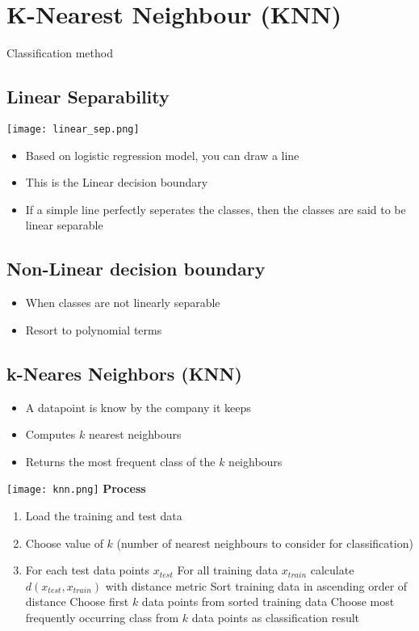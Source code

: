 \section{K-Nearest Neighbour (KNN)}
Classification method

\subsection{Linear Separability}
\texttt{[image: linear\_sep.png]}

\begin{itemize}
    \item Based on logistic regression model, you can draw a line
    \item This is the Linear decision boundary
    \item If a simple line perfectly seperates the classes, then the classes are said to be linear separable
\end{itemize}

\subsection{Non-Linear decision boundary}
\begin{itemize}
    \item When classes are not linearly separable
    \item Resort to polynomial terms
\end{itemize}

\subsection{k-Neares Neighbors (KNN)}
\begin{itemize}
    \item A datapoint is know by the company it keeps
    \item Computes $k$ nearest neighbours
    \item Returns the most frequent class of the $k$ neighbours
\end{itemize}
\texttt{[image: knn.png]}
\textbf{Process}
\begin{enumerate}
    \item Load the training and test data
    \item Choose value of $k$ (number of nearest neighbours to consider for classification)
    \item For each test data points $x_{test}$
        \subitem For all training data $x_{train}$ calculate $d(x_{test}, x_{train})$ with distance metric
        \subitem Sort training data in ascending order of distance
        \subitem Choose first $k$ data points from sorted training data
        \subitem Choose most frequently occurring class from $k$ data points as classification result
\end{enumerate}

